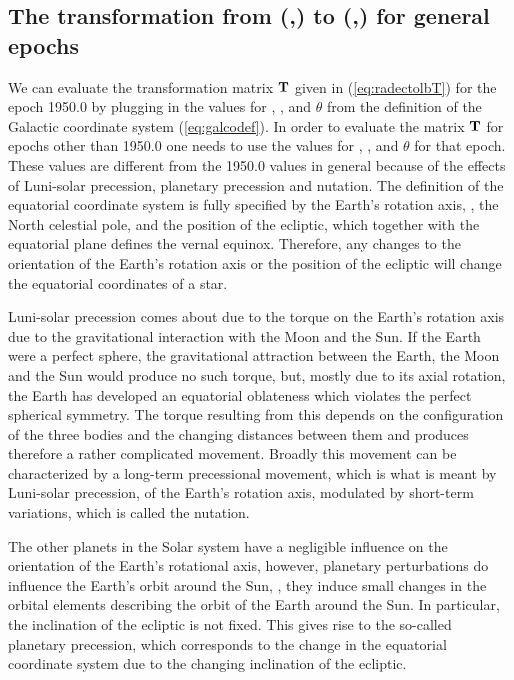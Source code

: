 \subsection{The transformation from (\ra,\dec) to (\gall,\galb) for general epochs}

We can evaluate the transformation matrix $\mathbf{T}$ given in
(\ref{eq:radectolbT}) for the epoch 1950.0 by plugging in the values
for \rangp, \decngp, and $\theta$ from the definition of the Galactic
coordinate system (\ref{eq:galcodef}). In order to evaluate the matrix
$\mathbf{T}$ for epochs other than 1950.0 one needs to use the values for
\rangp, \decngp, and $\theta$ for that epoch. These values are
different from the 1950.0 values in general because of the effects of
Luni-solar precession, planetary precession and nutation. The
definition of the equatorial coordinate system is fully specified by
the Earth's rotation axis, \ie, the North celestial pole, and the
position of the ecliptic, which together with the equatorial plane
defines the vernal equinox. Therefore, any changes to the orientation
of the Earth's rotation axis or the position of the ecliptic will
change the equatorial coordinates of a star.

Luni-solar precession comes about due to the torque on the Earth's
rotation axis due to the gravitational interaction with the Moon and
the Sun. If the Earth were a perfect sphere, the gravitational
attraction between the Earth, the Moon and the Sun would produce no
such torque, but, mostly due to its axial rotation, the Earth has
developed an equatorial oblateness which violates the perfect
spherical symmetry. The torque resulting from this depends on the
configuration of the three bodies and the changing distances between
them and produces therefore a rather complicated movement. Broadly
this movement can be characterized by a long-term precessional
movement, which is what is meant by Luni-solar precession, of the
Earth's rotation axis, modulated by short-term variations, which is
called the nutation.

The other planets in the Solar system have a negligible influence on
the orientation of the Earth's rotational axis, however, planetary
perturbations do influence the Earth's orbit around the Sun, \ie, they
induce small changes in the orbital elements describing the orbit of
the Earth around the Sun. In particular, the inclination of the
ecliptic is not fixed. This gives rise to the so-called planetary
precession, which corresponds to the change in the equatorial
coordinate system due to the changing inclination of the ecliptic.

